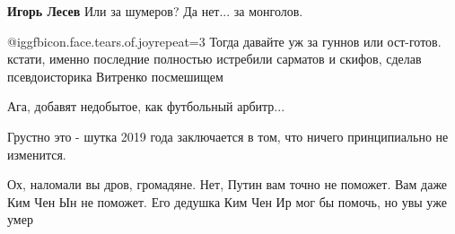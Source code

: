 \begin{itemize}
\begin{itemize}
\textbf{Игорь Лесев} Или за шумеров? Да нет... за монголов.


 @igg{fbicon.face.tears.of.joy}{repeat=3} Тогда давайте уж за гуннов или ост-готов. кстати, именно последние
полностью истребили сарматов и скифов, сделав псевдоисторика Витренко
посмешищем

\end{itemize} %

Ага, добавят недобытое, как футбольный арбитр...

Грустно это - шутка 2019 года заключается в том, что ничего принципиально не изменится.


Ох, наломали вы дров, громадяне. Нет, Путин вам точно не поможет. Вам даже Ким
Чен Ын не поможет. Его дедушка Ким Чен Ир мог бы помочь, но увы уже умер

\end{itemize} %
